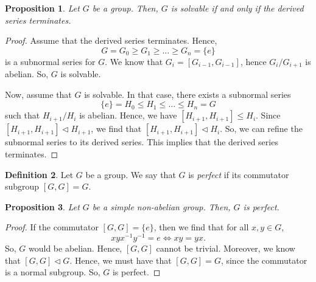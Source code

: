 \documentclass[a4paper, openany]{memoir}
\theoremstyle{definition}
\newtheorem{definition}{Definition}[section]
\theoremstyle{plain}
\newtheorem{proposition}[definition]{Proposition}
\begin{document}
    \begin{proposition}
        Let $G$ be a group. Then, $G$ is solvable if and only if the derived series terminates.
    \end{proposition}
    \begin{proof}
        Assume that the derived series terminates. Hence,
        \[G = G_0 \geq G_1 \geq \dots \geq G_n = \{e\}\]
        is a subnormal series for $G$. We know that $G_i = [G_{i-1}, G_{i-1}]$, hence $G_i/G_{i+1}$ is abelian. So, $G$ is solvable.

        Now, assume that $G$ is solvable. In that case, there exists a subnormal series
        \[\{e\} = H_0 \leq H_1 \leq \dots \leq H_n = G\]
        such that $H_{i+1}/H_i$ is abelian. Hence, we have $[H_{i+1}, H_{i+1}] \leq H_i$. Since $[H_{i+1}, H_{i+1}] \vartriangleleft H_{i+1}$, we find that $[H_{i+1}, H_{i+1}] \vartriangleleft H_i$. So, we can refine the subnormal series to its derived series. This implies that the derived series terminates.
    \end{proof}

    \begin{definition}
        Let $G$ be a group. We say that $G$ is \emph{perfect} if its commutator subgroup $[G, G] = G$.
    \end{definition}

    \begin{proposition}
        Let $G$ be a simple non-abelian group. Then, $G$ is perfect.
    \end{proposition}
    \begin{proof}
        If the commutator $[G, G] = \{e\}$, then we find that for all $x,y \in G$, 
        \[xyx^{-1}y^{-1} = e \iff xy = yx.\]
        So, $G$ would be abelian. Hence, $[G, G]$ cannot be trivial. Moreover, we know that $[G, G] \vartriangleleft G$. Hence, we must have that $[G, G] = G$, since the commutator is a normal subgroup. So, $G$ is perfect.
    \end{proof}
\end{document}
